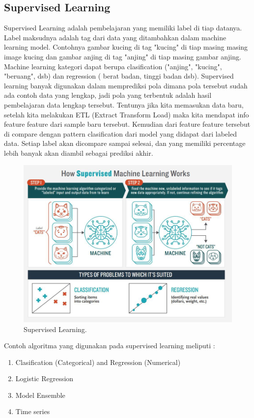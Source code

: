 \subsection{Supervised Learning}
\hfill\break
Supervised Learning adalah pembelajaran yang memiliki label di tiap datanya. Label maksudnya adalah tag dari data yang ditambahkan dalam machine learning model. Contohnya gambar kucing di tag "kucing" di tiap masing masing image kucing dan gambar anjing di tag "anjing" di tiap masing gambar anjing. Machine learning kategori dapat berupa clasification ("anjing", "kucing", "beruang", dsb) dan regression ( berat badan, tinggi badan dsb). Supervised learning banyak digunakan dalam memprediksi pola dimana pola tersebut sudah ada contoh data yang lengkap, jadi pola yang terbentuk adalah hasil pembelajaran data lengkap tersebut. Tentunya jika kita memasukan data baru, setelah kita melakukan ETL (Extract Transform Load) maka kita mendapat info feature feature dari sample baru tersebut. Kemudian dari feature feature tersebut di compare dengan pattern clasification dari model yang didapat dari labeled data. Setiap label akan dicompare sampai selesai, dan yang memiliki percentage lebih banyak akan diambil sebagai prediksi akhir.

\begin{figure}[H]
	\includegraphics[width=1\textwidth]{figures/chapter1/supervisedlearning.jpeg}
	\centering
	\caption{Supervised Learning.}
\end{figure}
\noindent
Contoh algoritma yang digunakan pada supervised learning meliputi :
\begin{enumerate}
	\item Clasification (Categorical) and Regression (Numerical)
    \item Logistic Regression
    \item Model Ensemble
	\item Time series
\end{enumerate}

